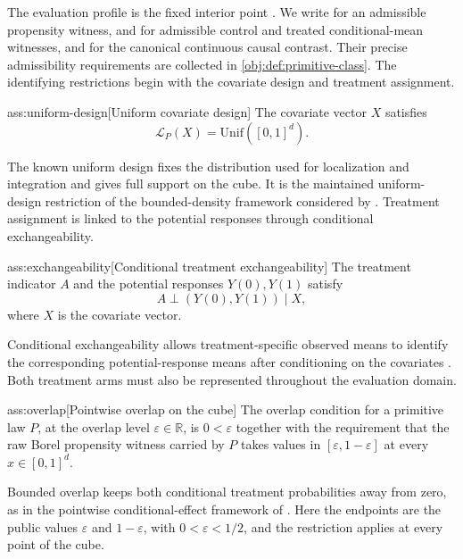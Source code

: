 \documentclass[11pt]{article}
\begin{document}
The evaluation profile is the fixed interior point . We write  for an admissible propensity witness,  and  for admissible control and treated conditional-mean witnesses, and  for the canonical continuous causal contrast. Their precise admissibility requirements are collected in \cref{obj:def:primitive-class}. The identifying restrictions begin with the covariate design and treatment assignment.

\begin{assumptionv}{ass:uniform-design}[Uniform covariate design]
The covariate vector \(X\) satisfies
\[
\mathcal L_P(X)=\mathrm{Unif}([0,1]^d).
\]
\end{assumptionv}

The known uniform design fixes the distribution used for localization and integration and gives full support on the cube. It is the maintained uniform-design restriction of the bounded-density framework considered by \citep{KennedyBalakrishnanRobinsWasserman2024}. Treatment assignment is linked to the potential responses through conditional exchangeability.

\begin{assumptionv}{ass:exchangeability}[Conditional treatment exchangeability]
The treatment indicator \(A\) and the potential responses \(Y(0),Y(1)\) satisfy
\[
A\perp(Y(0),Y(1))\mid X,
\]
where \(X\) is the covariate vector.
\end{assumptionv}

Conditional exchangeability allows treatment-specific observed means to identify the corresponding potential-response means after conditioning on the covariates \citep{ChakraborttyDai2022}. Both treatment arms must also be represented throughout the evaluation domain.

\begin{assumptionv}{ass:overlap}[Pointwise overlap on the cube]
The overlap condition for a primitive law \(P\), at the overlap level \(\varepsilon\in\mathbb R\), is \(0<\varepsilon\) together with the requirement that the raw Borel propensity witness carried by \(P\) takes values in \([\varepsilon,1-\varepsilon]\) at every \(x\in[0,1]^d\).
\end{assumptionv}

Bounded overlap keeps both conditional treatment probabilities away from zero, as in the pointwise conditional-effect framework of \citep{KennedyBalakrishnanRobinsWasserman2024}. Here the endpoints are the public values \(\varepsilon\) and \(1-\varepsilon\), with \(0<\varepsilon<1/2\), and the restriction applies at every point of the cube.
\end{document}
